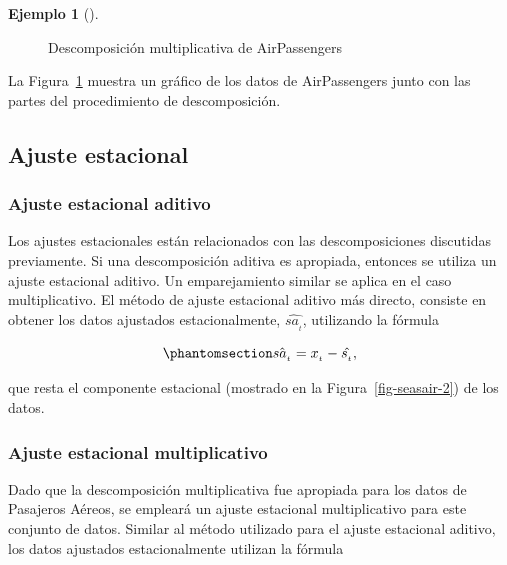 \documentclass[
  us-letterpaper,
]{scrreprt}
\theoremstyle{definition}
\newtheorem{example}{Ejemplo}[chapter]
\theoremstyle{plain}
\theoremstyle{plain}
\theoremstyle{definition}
\theoremstyle{remark}
\begin{document}
\begin{example}[]
\begin{tcolorbox}
\begin{enumerate}
\begin{figure}[H]
{  }

  \caption{\label{fig-descmul}Descomposición multiplicativa de
  AirPassengers}

  \end{figure}%
\end{enumerate}

La Figura~\ref{fig-descmul} muestra un gráfico de los datos de
AirPassengers junto con las partes del procedimiento de descomposición.

\end{tcolorbox}

\end{example}

\subsection{Ajuste estacional}\label{ajuste-estacional}

\subsubsection{Ajuste estacional
aditivo}\label{ajuste-estacional-aditivo}

Los ajustes estacionales están relacionados con las descomposiciones
discutidas previamente. Si una descomposición aditiva es apropiada,
entonces se utiliza un ajuste estacional aditivo. Un emparejamiento
similar se aplica en el caso multiplicativo. El método de ajuste
estacional aditivo más directo, consiste en obtener los datos ajustados
estacionalmente, \(\hat{sa_{_t}}\), utilizando la fórmula

\begin{equation}\phantomsection\label{eq-AEadd}{
\hat{sa_{_t}}=x_{_t}-\hat{s_{_t}},
}\end{equation}

que resta el componente estacional (mostrado en la
Figura~\ref{fig-seasair-2}) de los datos.

\subsubsection{Ajuste estacional
multiplicativo}\label{ajuste-estacional-multiplicativo}

Dado que la descomposición multiplicativa fue apropiada para los datos
de Pasajeros Aéreos, se empleará un ajuste estacional multiplicativo
para este conjunto de datos. Similar al método utilizado para el ajuste
estacional aditivo, los datos ajustados estacionalmente utilizan la
fórmula
\end{document}
